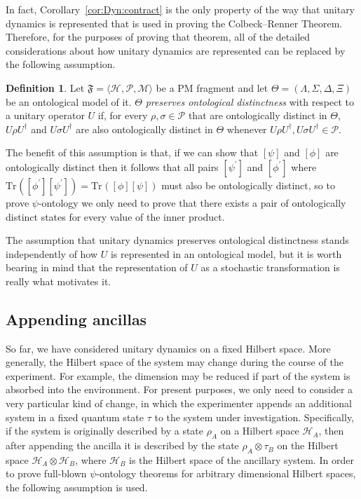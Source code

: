\documentclass[DIV=calc,fontsize=12pt]{scrartcl} %
\theoremstyle{definition}
\newtheorem{definition}{Definition}[section]
\theoremstyle{plain}
\newcommand{\Proj}[1]{\ensuremath{\left [ #1 \right ]}}
\newcommand{\Hilb}[1][]{\ensuremath{\mathcal{H}_{#1}}}
\newcommand{\Tr}[2][]{\ensuremath{\text{Tr}_{#1} \left ( #2 \right )}}
\begin{document}
In fact, Corollary~\ref{cor:Dyn:contract} is the only property of the
way that unitary dynamics is represented that is used in proving the
Colbeck--Renner Theorem.  Therefore, for the purposes of proving that
theorem, all of the detailed considerations about how unitary dynamics
are represented can be replaced by the following assumption.
\begin{definition}
\label{def:Dyn:uind}
Let $\mathfrak{F} = \langle \Hilb, \mathcal{P}, \mathcal{M} \rangle$
be a PM fragment and let $\Theta = (\Lambda, \Sigma, \Delta, \Xi)$
be an ontological model of it.  $\Theta$ \emph{preserves ontological
distinctness} with respect to a unitary operator $U$ if, for every
$\rho, \sigma \in \mathcal{P}$ that are ontologically distinct in
$\Theta$, $U \rho U^{\dagger}$ and $U \sigma U^{\dagger}$ are also
ontologically distinct in $\Theta$ whenever $U \rho U^{\dagger}, U
\sigma U^{\dagger} \in \mathcal{P}$.
\end{definition}
The benefit of this assumption is that, if we can show that
$\Proj{\psi}$ and $\Proj{\phi}$ are ontologically distinct then it
follows that all pairs $\Proj{\psi^{\prime}}$ and
$\Proj{\phi^{\prime}}$ where
$\Tr{\Proj{\phi^{\prime}}\Proj{\psi^{\prime}}} =
\Tr{\Proj{\phi}\Proj{\psi}}$ must also be ontologically distinct, so
to prove $\psi$-ontology we only need to prove that there exists a
pair of ontologically distinct states for every value of the inner
product.

The assumption that unitary dynamics preserves ontological
distinctness stands independently of how $U$ is represented in an
ontological model, but it is worth bearing in mind that the
representation of $U$ as a stochastic transformation is really what
motivates it.

\subsection{Appending ancillas}

\label{Dyn:Bet}

So far, we have considered unitary dynamics on a fixed Hilbert space.
More generally, the Hilbert space of the system may change during the
course of the experiment.  For example, the dimension may be reduced
if part of the system is absorbed into the environment.  For present
purposes, we only need to consider a very particular kind of change,
in which the experimenter appends an additional system in a fixed
quantum state $\tau$ to the system under investigation.  Specifically,
if the system is originally described by a state $\rho_A$ on a Hilbert
space $\Hilb[A]$, then after appending the ancilla it is described by
the state $\rho_A \otimes \tau_B$ on the Hilbert space $\Hilb[A]
\otimes \Hilb[B]$, where $\Hilb[B]$ is the Hilbert space of the
ancillary system.  In order to prove full-blown $\psi$-ontology
theorems for arbitrary dimensional Hilbert spaces, the following
assumption is used.
\end{document}

